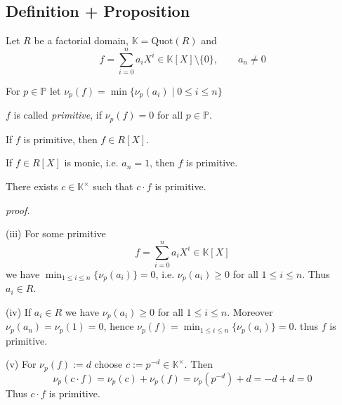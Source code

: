 \documentclass[12pt]{book}
\begin{document}
\begin{spacing}{1.3}
\subsection{Definition + Proposition} %
Let $R$ be a factorial domain, $\mathbb{K}=\textrm{Quot}(R)$ and $$f = \sum_{i=0}^n a_i X^{i} \in \mathbb{K}[X] \setminus \{0\}, \qquad a_n \neq 0$$
\begin{compactenum}
\item For $p \in \mathbb{P}$ let $\nu_p(f)= \min\{\nu_p(a_i) \mid 0 \leqslant i \leqslant n\}$
\item $f$ is called \textit{primitive}, if $\nu_p(f)=0$ for all $p \in \mathbb{P}$. 
\item If $f$ is primitive, then $f \in R[X]$.
\item If $f \in R[X]$ is monic, i.e. $a_n=1$, then $f$ is primitive.
\item There exists $c \in \mathbb{K}^{\times}$ such that $c \cdot f$ is primitive.
\end{compactenum}
\textit{proof.}
\begin{compactenum}
\item[(iii)] For some primitive $$f=\sum_{i=0}^n a_iX^{i} \in \mathbb{K}[X]$$ we have $\min_{1\leqslant i \leqslant n}\{\nu_p(a_i)\}=0$, i.e. $\nu_p(a_i) \geqslant 0$ for all $1 \leqslant i \leqslant n$. Thus $a_i \in R$.
\item[(iv)] If $a_i \in R$ we have $\nu_p(a_i) \geqslant 0$ for all $1 \leqslant i \leqslant n$. Moreover $\nu_p(a_n)=\nu_p(1)=0$, hence $\nu_p(f)=\min_{1\leqslant i \leqslant n}\{\nu_p(a_i)\}=0$. thus $f$ is primitive.
\item[(v)] For $\nu_p(f):=d$ choose $c:=p^{-d} \in \mathbb{K}^{\times}$. Then 
$$\nu_p(c\cdot f)=\nu_p(c)+\nu_p(f)=\nu_p(p^{-d})+d=-d+d=0$$
Thus $c\cdot f$ is primitive.
\end{compactenum}


\end{spacing}
\end{document}
